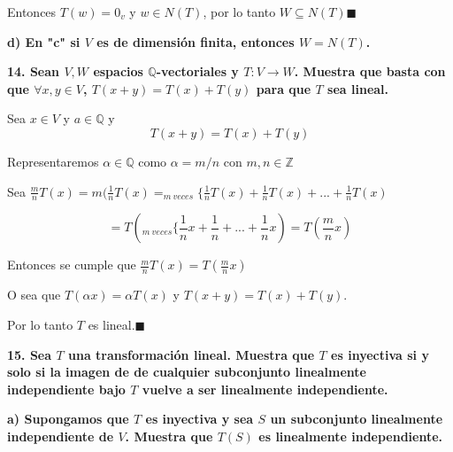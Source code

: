 \documentclass{article}
\begin{document}
Entonces $T(w)=0_{v}$ y $w\in N(T)$, por lo tanto $W\subseteq N(T)\blacksquare$

\textbf{d) En "c" si $V$ es de dimensión finita, entonces $W=N(T)$.}





\textbf{14. Sean $V,W$ espacios $\mathbb{Q}$-vectoriales y $T: V \rightarrow W$. Muestra que basta con que $\forall x,y \in V$, $T(x+y)=T(x)+T(y)$ para que $T$ sea lineal.} 

Sea $x \in V$ y $a \in \mathbb{Q}$ y $$T(x+y)=T(x)+T(y)$$

Representaremos $\alpha \in \mathbb{Q}$ como $\alpha=m/n$ con $m,n \in \mathbb{Z}$

Sea $\frac{m}{n} T(x)=m(\frac{1}{n}T(x)=_{m\ veces}\{\frac{1}{n}T(x)+\frac{1}{n}T(x)+...+\frac{1}{n}T(x)$

$$=T(_{m\ veces}\{\frac{1}{n}x + \frac{1}{n} + ... + \frac{1}{n}x)=T(\frac{m}{n}x)$$

Entonces se cumple que $\frac{m}{n}T(x)=T(\frac{m}{n}x)$

O sea que $T(\alpha x)=\alpha T(x)$ y $T(x+y)=T(x)+T(y)$.

Por lo tanto $T$ es lineal.$\blacksquare$

\textbf{15. Sea $T$ una transformación lineal. Muestra que $T$ es inyectiva si y solo si la imagen de de cualquier subconjunto linealmente independiente bajo $T$ vuelve a ser linealmente independiente.}

\textbf{a) Supongamos que $T$ es inyectiva y sea $S$ un subconjunto linealmente independiente de $V$. Muestra que $T(S)$ es linealmente independiente.}
\end{document}
